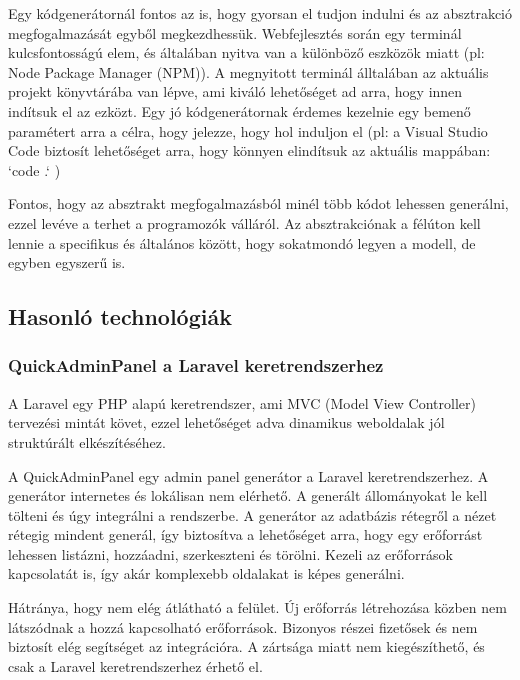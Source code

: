 \documentclass[a4paper,12pt,oneside]{report}
\begin{document}
\begin{justify}
	Egy kódgenerátornál fontos az is, hogy gyorsan el tudjon indulni és az absztrakció megfogalmazását egyből megkezdhessük. Webfejlesztés során egy terminál kulcsfontosságú elem, és általában nyitva van a különböző eszközök miatt (pl: Node Package Manager (NPM)). A megnyitott terminál álltalában az aktuális projekt könyvtárába van lépve, ami kiváló lehetőséget ad arra, hogy innen indítsuk el az ezközt. Egy jó kódgenerátornak érdemes kezelnie egy bemenő paramétert arra a célra, hogy jelezze, hogy hol induljon el (pl: a Visual Studio Code biztosít lehetőséget arra, hogy könnyen elindítsuk az aktuális mappában: `code .` ) 

	Fontos, hogy az absztrakt megfogalmazásból minél több kódot lehessen generálni, ezzel levéve a terhet a programozók válláról. Az absztrakciónak a félúton kell lennie a specifikus és általános között, hogy sokatmondó legyen a modell, de egyben egyszerű is.


\end{justify}

\newpage
\subsection{Hasonló technológiák}
\subsubsection{QuickAdminPanel a Laravel keretrendszerhez}

\begin{justify}

	A Laravel egy PHP alapú keretrendszer, ami MVC (Model View Controller) tervezési mintát követ, ezzel lehetőséget adva dinamikus weboldalak jól struktúrált elkészítéséhez. 

	A QuickAdminPanel egy admin panel generátor a Laravel keretrendszerhez. A generátor internetes és lokálisan nem elérhető. A generált állományokat le kell tölteni és úgy integrálni a rendszerbe. A generátor az adatbázis rétegről a nézet rétegig mindent generál, így biztosítva a lehetőséget arra, hogy egy erőforrást lehessen listázni, hozzáadni, szerkeszteni és törölni. Kezeli az erőforrások kapcsolatát is, így akár komplexebb oldalakat is képes generálni.

	Hátránya, hogy nem elég átlátható a felület. Új erőforrás létrehozása közben nem látszódnak a hozzá kapcsolható erőforrások. Bizonyos részei fizetősek és nem biztosít elég segítséget az integrációra. A zártsága miatt nem kiegészíthető, és csak a Laravel keretrendszerhez érhető el.

\end{justify}
\end{document}
